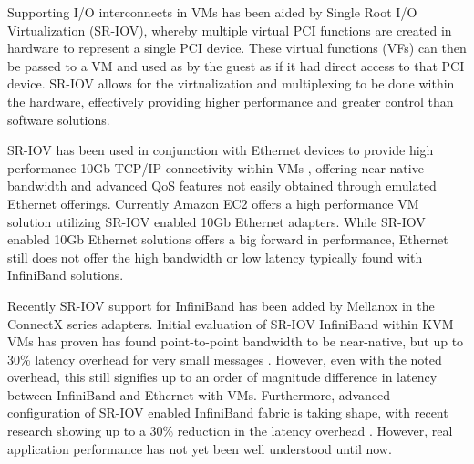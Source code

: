 \documentclass[10pt]{sigplanconf}
\begin{document}
Supporting I/O interconnects in VMs has been aided by Single Root I/O Virtualization (SR-IOV), whereby multiple virtual PCI functions are created in hardware to represent a single PCI device. These virtual functions (VFs) can then be passed to a VM and used as by the guest as if it had direct access to that PCI device. SR-IOV allows for the virtualization and multiplexing to be done within the hardware, effectively providing higher performance and greater control than software solutions. 

SR-IOV has been used in conjunction with Ethernet devices to provide high performance 10Gb TCP/IP connectivity within VMs \cite{Liu2010}, offering near-native bandwidth and advanced QoS features not easily obtained through emulated Ethernet offerings. Currently Amazon EC2 offers a high performance VM solution utilizing SR-IOV enabled 10Gb Ethernet adapters. While SR-IOV enabled 10Gb Ethernet solutions offers a big forward in performance, Ethernet still does not offer the high bandwidth or low latency typically found with InfiniBand solutions. 

Recently SR-IOV support for InfiniBand has been added by Mellanox in the ConnectX series adapters. Initial evaluation of SR-IOV InfiniBand within KVM VMs has proven has found point-to-point bandwidth to be near-native, but up to 30\% latency overhead for very small messages \cite{jose2013sr, RuivoAGTKNR14}. However, even with the noted overhead, this still signifies up to an order of magnitude difference in latency between InfiniBand and Ethernet with VMs. Furthermore, advanced configuration of SR-IOV enabled InfiniBand fabric is taking shape, with recent research showing up to a 30\% reduction in the latency overhead \cite{Musleh2014cloud}. However, real application performance has not yet been well understood until now. 
\end{document}
